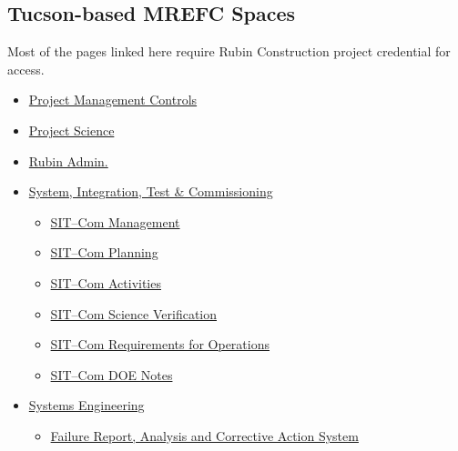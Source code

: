 \begin{small}

\subsection{Tucson-based MREFC Spaces}
Most of the pages linked here require Rubin Construction project credential for access.

\begin{itemize}
	\item \href{https://confluence.lsstcorp.org/display/PC/Project+Management+Controls+System+Home}{Project Management Controls}
	\item \href{https://confluence.lsstcorp.org/display/PS/Project+Science+Home}{Project Science}
	\item \href{https://confluence.lsstcorp.org/display/ROA/Rubin+Obs.+Admins}{Rubin Admin.}
	\item \href{https://confluence.lsstcorp.org/pages/viewpage.action?pageId=48399826}{System, Integration, Test \& Commissioning}
	\begin{itemize}
		\item \href{https://confluence.lsstcorp.org/display/LSSTCOM/SIT-Com+Management?src=contextnavpagetreemode}{SIT--Com Management}
		\item \href{https://confluence.lsstcorp.org/display/LSSTCOM/SIT-Com+Planning?src=contextnavpagetreemode}{SIT--Com Planning}
		\item \href{https://confluence.lsstcorp.org/display/LSSTCOM/SIT-Com+Activities?src=contextnavpagetreemode}{SIT--Com Activities}
		\item \href{https://confluence.lsstcorp.org/display/LSSTCOM/SIT-Com+Science+Verification?src=contextnavpagetreemode}{SIT--Com Science Verification}
		\item\href{https://confluence.lsstcorp.org/display/LSSTCOM/SIT-Com+Requirements+for+Operations?src=contextnavpagetreemode}{SIT--Com Requirements for Operations}
		\item \href{https://confluence.lsstcorp.org/display/LSSTCOM/DOE+Notes?src=contextnavpagetreemode}{SIT--Com DOE Notes}
	\end{itemize}
	\item \href{https://confluence.lsstcorp.org/display/SYSENG/Systems+Engineering+Home}{Systems Engineering}
	\begin{itemize}
		\item \href{https://confluence.lsstcorp.org/pages/viewpage.action?pageId=97681640}{Failure Report, Analysis and Corrective Action System}

\end{itemize}
\end{itemize}
\end{small}

